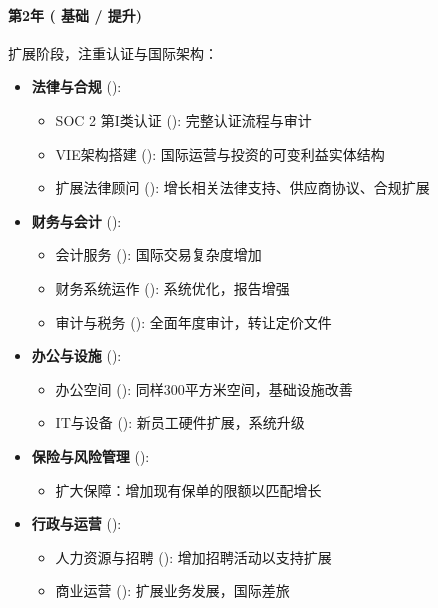 \documentclass[11点, A4纸, 单面]{article}
\begin{document}
\paragraph{第2年 ( 基础 /  提升)} 扩展阶段，注重认证与国际架构：

\begin{itemize}
    \item \textbf{法律与合规} ():
    \begin{itemize}
        \item SOC 2 第I类认证 (): 完整认证流程与审计
        \item VIE架构搭建 (): 国际运营与投资的可变利益实体结构
        \item 扩展法律顾问 (): 增长相关法律支持、供应商协议、合规扩展
    \end{itemize}



\item \textbf{财务与会计} ():
\begin{itemize}
    \item 会计服务 (): 国际交易复杂度增加
    \item 财务系统运作 (): 系统优化，报告增强
    \item 审计与税务 (): 全面年度审计，转让定价文件
\end{itemize}

\item \textbf{办公与设施} ():
\begin{itemize}
    \item 办公空间 (): 同样300平方米空间，基础设施改善
    \item IT与设备 (): 新员工硬件扩展，系统升级
\end{itemize}

\item \textbf{保险与风险管理} ():
\begin{itemize}
    \item 扩大保障：增加现有保单的限额以匹配增长
\end{itemize}

\item \textbf{行政与运营} ():
\begin{itemize}
    \item 人力资源与招聘 (): 增加招聘活动以支持扩展
    \item 商业运营 (): 扩展业务发展，国际差旅
\end{itemize}
\end{itemize}
\end{document}
